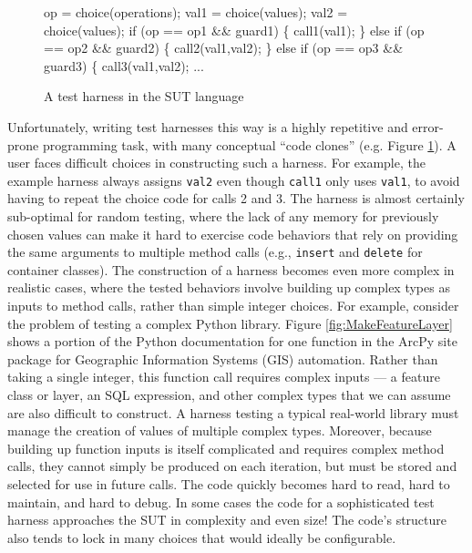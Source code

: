 \begin{figure}[b]
{\scriptsize
\begin{code}
op = choice(operations);
val1 = choice(values);
val2 = choice(values);
if (op == op1 \&\& guard1) \{
    call1(val1);
\} else if (op == op2 \&\& guard2) \{
    call2(val1,val2);
\} else if (op == op3 \&\& guard3) \{
    call3(val1,val2);
...
\end{code}
}
\vspace{-0.15in}
\caption {A test harness in the SUT language}
\label{fig:badharness}
\end{figure}

Unfortunately, writing test harnesses this way is a highly repetitive
and error-prone programming task, with many conceptual ``code clones''
(e.g. Figure \ref{fig:badharness}). A user faces difficult choices in
constructing such a harness. For example, the example harness always assigns {\tt val2} even
though {\tt call1} only uses {\tt val1}, to avoid having to repeat the
choice code for calls 2 and 3.  The harness is almost certainly
sub-optimal for  random testing, where the lack of any
memory for previously chosen values can make it hard to exercise code
behaviors that rely on providing the same arguments to multiple method
calls (e.g., {\tt insert} and {\tt delete} for container classes).
The construction of a harness becomes even more complex in realistic
cases, where the tested behaviors involve building up complex types as
inputs to method calls, rather than simple integer choices. For
example, consider the problem of testing a complex Python library.  Figure
\ref{fig:MakeFeatureLayer} shows a portion of the Python documentation for one function in the ArcPy site
package for Geographic Information Systems (GIS) automation.  Rather than taking a single integer, this
function call requires complex inputs --- a feature class or
layer, an SQL expression, and other complex types that we can assume
are also difficult to construct.  A harness testing a typical
real-world library must manage the creation of values of multiple complex types.
Moreover, because building up function inputs is itself complicated
and requires complex method calls, they cannot simply be produced on each iteration, but must be
stored and selected for use in future calls.
The code quickly becomes hard to read, hard to maintain, and hard to
debug.  In some cases \cite{AMAI} the code for a sophisticated test
harness approaches the SUT in complexity and even size!  The code's
structure also tends to lock in many choices that would ideally be configurable.

